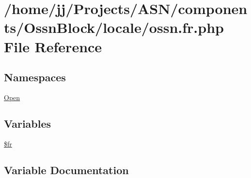 \hypertarget{components_2_ossn_block_2locale_2ossn_8fr_8php}{}\section{/home/jj/\+Projects/\+A\+S\+N/components/\+Ossn\+Block/locale/ossn.fr.\+php File Reference}
\label{components_2_ossn_block_2locale_2ossn_8fr_8php}
\subsection*{Namespaces}
\begin{DoxyCompactItemize}
\item 
 \hyperlink{namespace_open}{Open}
\end{DoxyCompactItemize}
\subsection*{Variables}
\begin{DoxyCompactItemize}
\item 
\hyperlink{components_2_ossn_block_2locale_2ossn_8fr_8php_ad5107c697816e7b7f89ad1b3e94e3e0e}{\$fr}
\end{DoxyCompactItemize}


\subsection{Variable Documentation}
